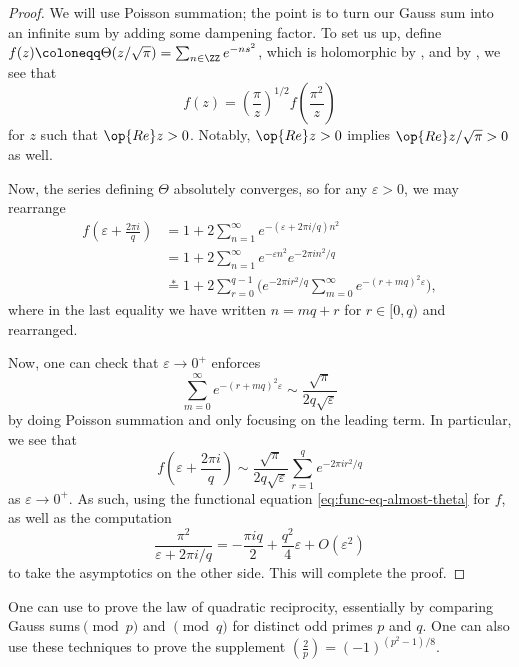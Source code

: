 \documentclass[../notes.tex]{subfiles}
\begin{document}
\begin{proof}
	We will use Poisson summation; the point is to turn our Gauss sum into an infinite sum by adding some dampening factor. To set us up, define $f(z)\coloneqq\Theta(z/\sqrt\pi)=\sum_{n\in\ZZ}e^{-ns^2}$, which is holomorphic by , and by , we see that
	\begin{equation}
		f(z)=\left(\frac\pi z\right)^{1/2}f\left(\frac{\pi^2}z\right) \label{eq:func-eq-almost-theta}
	\end{equation}
	for $z$ such that $\op{Re}z>0$. Notably, $\op{Re}z>0$ implies $\op{Re}z/\sqrt\pi>0$ as well.

	Now, the series defining $\Theta$ absolutely converges, so for any $\varepsilon>0$, we may rearrange
	\begin{align*}
		f\left(\varepsilon+\frac{2\pi i}q\right) &= 1+2\sum_{n=1}^\infty e^{-(\varepsilon+2\pi i/q)n^2} \\
		&= 1+2\sum_{n=1}^\infty e^{-\varepsilon n^2}e^{-2\pi in^2/q} \\
		&\stackrel*= 1+2\sum_{r=0}^{q-1}\Bigg(e^{-2\pi ir^2/q}\sum_{m=0}^\infty e^{-(r+mq)^2\varepsilon}\Bigg),
	\end{align*}
	where in the last equality we have written $n=mq+r$ for $r\in[0,q)$ and rearranged.

	Now, one can check that $\varepsilon\to0^+$ enforces
	\[\sum_{m=0}^\infty e^{-(r+mq)^2\varepsilon}\sim\frac{\sqrt\pi}{2q\sqrt\varepsilon}\]
	by doing Poisson summation and only focusing on the leading term. In particular, we see that
	\[f\left(\varepsilon+\frac{2\pi i}q\right)\sim\frac{\sqrt\pi}{2q\sqrt\varepsilon}\sum_{r=1}^qe^{-2\pi ir^2/q}\]
	as $\varepsilon\to0^+$. As such, using the functional equation \eqref{eq:func-eq-almost-theta} for $f$, as well as the computation
	\[\frac{\pi^2}{\varepsilon+2\pi i/q}=-\frac{\pi iq}2+\frac{q^2}4\varepsilon+O\left(\varepsilon^2\right)\]
	to take the asymptotics on the other side. This will complete the proof.
\end{proof}
\begin{remark}
	One can use  to prove the law of quadratic reciprocity, essentially by comparing Gauss sums$\pmod p$ and $\pmod q$ for distinct odd primes $p$ and $q$. One can also use these techniques to prove the supplement $\left(\frac2p\right)=(-1)^{\left(p^2-1\right)/8}$.
\end{remark}
\end{document}
